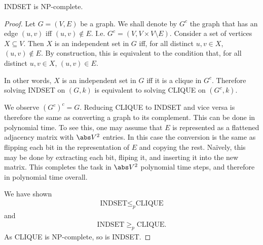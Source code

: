 \documentclass{article}
\begin{document}
\begin{claim*}
	INDSET is NP-complete.
	\begin{proof}
		Let $G=(V,E)$ be a graph. We shall denote by $G^c$ the graph that has an edge $(u,v)$ iff $(u,v)\not\in E$.
		I.e. $G^c=(V, V\times V\setminus E)$. Consider a set of vertices $X\subseteq V$. Then $X$ is an 
		independent set in $G$ iff, for all distinct $u,v\in X$, $(u,v)\not\in E$. By construction, this is equivalent to 
		the condition that, for all distinct $u,v\in X$, $(u,v)\in E$.

		In other words, $X$ is an independent set in $G$ iff it is a clique in $G^c$. Therefore solving 
		INDSET on $(G, k)$ is equivalent to solving CLIQUE on $(G^c, k)$.

		We observe $(G^c)^c=G$. Reducing CLIQUE to INDSET and vice versa is therefore the same as converting 
		a graph to its complement. This can be done in polynomial time. To see this, one may assume that 
		$E$ is represented as a flattened adjacency matrix with $\abs V^2$ entries. In this case the
		conversion is the same as flipping each bit in the representation of $E$ and copying the rest.
		Na\"ively, this may be done by extracting each bit, fliping it, and inserting it into the new 
		matrix. This completes the task in $\abs V^2$ polynomial time steps, and therefore in polynomial time 
		overall.

		We have shown
		\begin{align}
			\text{INDSET} \leq_p \text{CLIQUE}
		\end{align}
		and 
		\begin{align}
			\text{INDSET} \geq_p \text{CLIQUE}.
		\end{align}
		As CLIQUE is NP-complete, so is INDSET.
	\end{proof}
\end{claim*}
\end{document}

